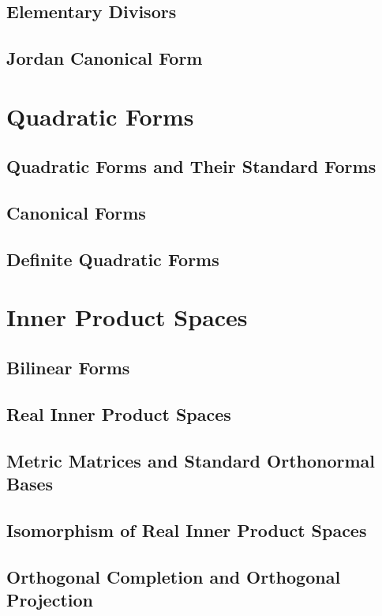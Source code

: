 \documentclass[11pt]{../../TexTemplate/elegantbook} %
\begin{document}
\section{Elementary Divisors}

\section{Jordan Canonical Form}

\chapter{Quadratic Forms}
\section{Quadratic Forms and Their Standard Forms}
\section{Canonical Forms}
\section{Definite Quadratic Forms}


\chapter{Inner Product Spaces}
\section{Bilinear Forms}

\section{Real Inner Product Spaces}

\section{Metric Matrices and Standard Orthonormal Bases}

\section{Isomorphism of Real Inner Product Spaces}

\section{Orthogonal Completion and Orthogonal Projection}
\end{document}
